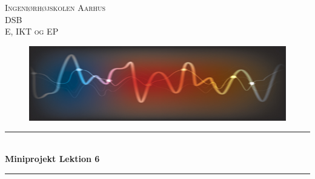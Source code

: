 \begin{titlepage}
		
		\newcommand{\HRule}{\rule{\linewidth}{0.5mm}} %
		
		\center %
		
		
		\textsc{\LARGE Ingeniørhøjskolen Aarhus}\\[1cm] %
		\textsc{\Large DSB}\\[0.5cm] %
		\textsc{\large E, IKT og EP}\\[0.8cm] %
		
		\begin{figure}[ht!]
			\centering
			\includegraphics[width=140mm]{figures/forside.jpg}
		\end{figure}
		
		
		\HRule \\[0.7cm]
		{ \huge \bfseries Miniprojekt Lektion 6}\\[0.4cm] %
		\HRule \\[1.2cm]
		
		

\end{titlepage}
